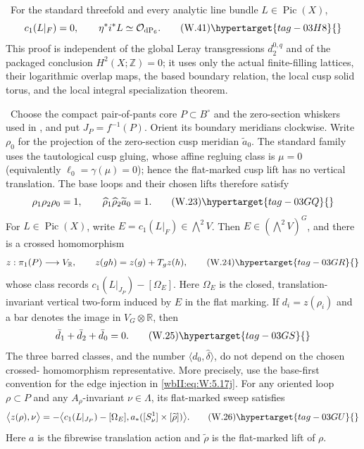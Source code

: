 
\begin{proposition}
\hypertarget{tag-03IL}{}\label{wbII:prop:direct-boundary-picard}


\ For the standard threefold and every analytic line bundle
$L\in\operatorname{Pic}(X)$,
\[
 c_1(L|_F)=0,
 \qquad
 \eta^*i^*L\simeq\mathcal O_{\mathrm{dP}_6}.
\tag{W.41}\hypertarget{tag-03H8}{}\label{wbII:eq:W:5.17q}
\]
This proof is independent of the global Leray transgressions
$d_2^{0,q}$ and of the packaged conclusion $H^2(X;\mathbb Z)=0$; it uses
only the actual finite-filling lattices, their logarithmic overlap maps, the
based boundary relation, the local cusp solid torus, and the local integral
specialization theorem.
\end{proposition}

\begin{lemma}
\hypertarget{tag-03IC}{}\label{wbII:lem:picard-crossed-defect}


\ Choose the compact pair-of-pants core $P\subset B^\circ$ and
the zero-section whiskers used in , and put
$J_P=f^{-1}(P)$.  Orient its boundary meridians clockwise.  Write
$\rho_0$ for the projection of the zero-section cusp meridian
$\widetilde a_0$.  The standard family uses the tautological cusp
gluing, whose affine regluing class is $\mu=0$ (equivalently
$\ell_0=\gamma(\mu)=0$); hence the flat-marked cusp lift has no vertical
translation.  The base loops and their chosen lifts therefore satisfy
\[
 \rho_1\rho_2\rho_0=1,
 \qquad
 \widehat\rho_1\widehat\rho_2\widetilde a_0=1.
\tag{W.23}\hypertarget{tag-03GQ}{}\label{wbII:eq:W:5.17g}
\]
For $L\in\operatorname{Pic}(X)$, write
$E=c_1(L|_F)\in\bigwedge^2V$.  Then $E\in(\bigwedge^2V)^G$, and there is a
crossed homomorphism
\[
 z:\pi_1(P)\longrightarrow V_{\mathbb R},\qquad
 z(gh)=z(g)+T_gz(h),
\tag{W.24}\hypertarget{tag-03GR}{}\label{wbII:eq:W:5.17h}
\]
whose class records
$c_1(L|_{J_P})-[\Omega_E]$.  Here $\Omega_E$ is the closed, translation-
invariant vertical two-form induced by $E$ in the flat marking.  If
$d_i=z(\rho_i)$ and a bar denotes the image in
$V_G\otimes\mathbb R$, then
\[
 \bar d_1+\bar d_2+\bar d_0=0.
\tag{W.25}\hypertarget{tag-03GS}{}\label{wbII:eq:W:5.17i}
\]
The three barred classes, and the number
$\langle d_0,\widehat\delta\rangle$, do not depend on the chosen crossed-
homomorphism representative.  More precisely, use the base-first convention
for the edge injection in \eqref{wbII:eq:W:5.17j}.  For any oriented loop $\rho\subset P$
and any $A_\rho$-invariant $\nu\in\Lambda$, its flat-marked sweep satisfies
\[
 \bigl\langle z(\rho),\nu\bigr\rangle
 =-\bigl\langle c_1(L|_{J_P})-[\Omega_E],
 a_*([S^1_\nu]\times[\widetilde\rho])\bigr\rangle.
\tag{W.26}\hypertarget{tag-03GU}{}\label{wbII:eq:W:5.17j'}
\]
Here $a$ is the fibrewise translation action and $\widetilde\rho$ is the
flat-marked lift of $\rho$.
\end{lemma}

